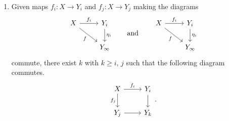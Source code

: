 \documentclass[main.tex]{subfiles}
\begin{document}
\begin{definition}
\begin{enumerate}
    \item Given maps $f_{i}\colon X \to Y_{i}$ and $f_{j}\colon X \to Y_{j}$ making the diagrams
      \begin{equation*}
        \begin{tikzcd}
          X
          \arrow[r, "f_{i}"]
          \arrow[dr, swap, "f"]
          & Y_{i}
          \arrow[d, "\eta_{i}"]
          \\
          & Y_{\infty}
        \end{tikzcd}
        \qquad\text{and}\qquad
        \begin{tikzcd}
          X
          \arrow[r, "f_{i}"]
          \arrow[dr, swap, "f"]
          & Y_{i}
          \arrow[d, "\eta_{i}"]
          \\
          & Y_{\infty}
        \end{tikzcd}
      \end{equation*}
      commute, there exist $k$ with $k \geq i$, $j$ such that the following diagram commutes.
      \begin{equation*}
        \begin{tikzcd}
          X
          \arrow[r, "f_{i}"]
          \arrow[d, swap, "f_{j}"]
          & Y_{i}
          \arrow[d]
          \\
          Y_{j}
          \arrow[r]
          & Y_{k}
        \end{tikzcd}.
      \end{equation*}
  \end{enumerate}
\end{definition}
\end{document}
